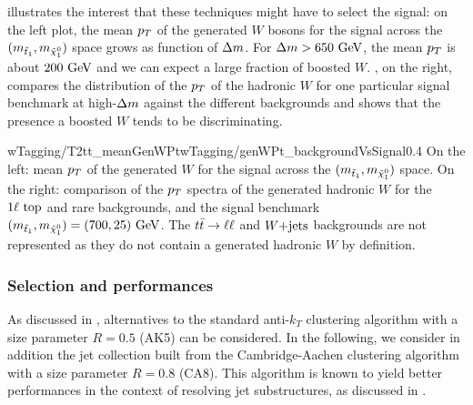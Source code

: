       illustrates the interest that these techniques
     might have to select the signal: on the left plot, the mean $p_T$ of the
     generated $W$ bosons for the signal across the $(m_{\tilde{t}_1},
     m_{\tilde{\chi}_1^0})$ space grows as function of $\Delta m$. For $\Delta m >
     650~\text{GeV}$, the mean $p_T$ is about $200~\text{GeV}$ and we can expect a large
     fraction of boosted $W$.  , on the right,
     compares the distribution of the $p_T$ of the hadronic $W$ for one
     particular signal benchmark at high-$\Delta m$ against the different
     backgrounds and shows that the presence a boosted $W$ tends to be
     discriminating.

                      {wTagging/T2tt_meanGenWPt}{wTagging/genWPt_backgroundVsSignal}{0.4}
                      {On the left: mean $p_T$ of the generated $W$ for the
                      signal across the $(m_{\tilde{t}_1}, m_{\tilde{\chi}_1^0})$
                      space.  On the right: comparison of the $p_T$ spectra of
                      the generated hadronic $W$ for the $1\ell~\text{top}$ and
                      rare backgrounds, and the signal benchmark
                      $(m_{\tilde{t}_1}, m_{\tilde{\chi}_1^0}) = (700,25) ~\text{GeV}$.
                      The $t\bar{t} \rightarrow \ell \ell$ and $\text{$W$+jets}$ backgrounds are not
                      represented as they do not contain a generated hadronic
                      $W$ by definition.}

    \subsubsection{Selection and performances}

    As discussed in , alternatives to the
    standard anti-$k_T$ clustering algorithm with a size parameter $R = 0.5$
    (AK5) can be considered. In the following, we consider in addition the jet
    collection built from the Cambridge-Aachen clustering algorithm with a size
    parameter $R = 0.8$ (CA8). This algorithm is known to yield better
    performances in the context of resolving jet substructures, as discussed in
    \cite{jetSubstructureSalam, jetClusteringComparison}.


